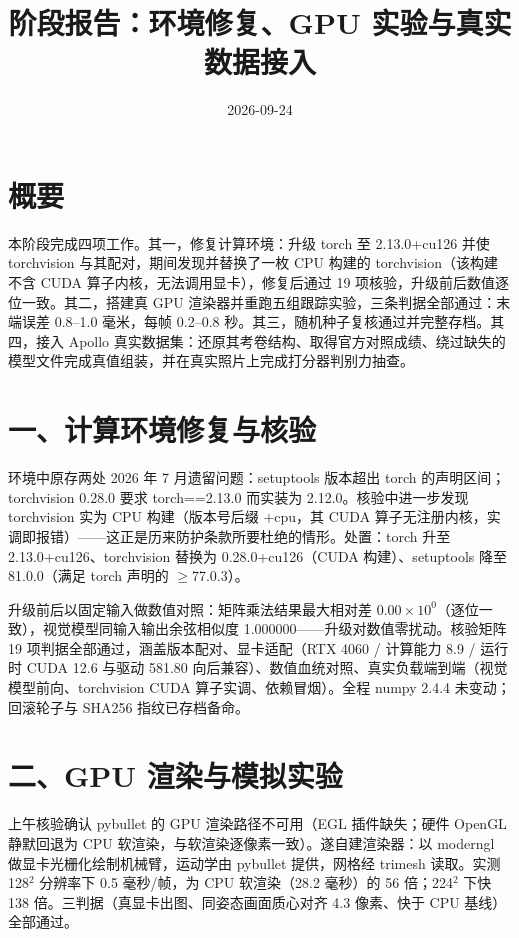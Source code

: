 \documentclass{article}
\title{阶段报告：环境修复、GPU 实验与真实数据接入}
\author{}
\date{2026-09-24}
\begin{document}
\maketitle

\section{概要}
本阶段完成四项工作。其一，修复计算环境：升级 torch 至 2.13.0+cu126 并使 torchvision 与其配对，期间发现并替换了一枚 CPU 构建的 torchvision（该构建不含 CUDA 算子内核，无法调用显卡），修复后通过 19 项核验，升级前后数值逐位一致。其二，搭建真 GPU 渲染器并重跑五组跟踪实验，三条判据全部通过：末端误差 0.8--1.0 毫米，每帧 0.2--0.8 秒。其三，随机种子复核通过并完整存档。其四，接入 Apollo 真实数据集：还原其考卷结构、取得官方对照成绩、绕过缺失的模型文件完成真值组装，并在真实照片上完成打分器判别力抽查。

\section{一、计算环境修复与核验}
环境中原存两处 2026 年 7 月遗留问题：setuptools 版本超出 torch 的声明区间；torchvision 0.28.0 要求 torch==2.13.0 而实装为 2.12.0。核验中进一步发现 torchvision 实为 CPU 构建（版本号后缀 +cpu，其 CUDA 算子无注册内核，实调即报错）——这正是历来防护条款所要杜绝的情形。处置：torch 升至 2.13.0+cu126、torchvision 替换为 0.28.0+cu126（CUDA 构建）、setuptools 降至 81.0.0（满足 torch 声明的 $\geq$77.0.3）。

升级前后以固定输入做数值对照：矩阵乘法结果最大相对差 $0.00\times10^{0}$（逐位一致），视觉模型同输入输出余弦相似度 1.000000——升级对数值零扰动。核验矩阵 19 项判据全部通过，涵盖版本配对、显卡适配（RTX 4060 / 计算能力 8.9 / 运行时 CUDA 12.6 与驱动 581.80 向后兼容）、数值血统对照、真实负载端到端（视觉模型前向、torchvision CUDA 算子实调、依赖冒烟）。全程 numpy 2.4.4 未变动；回滚轮子与 SHA256 指纹已存档备命。

\section{二、GPU 渲染与模拟实验}
上午核验确认 pybullet 的 GPU 渲染路径不可用（EGL 插件缺失；硬件 OpenGL 静默回退为 CPU 软渲染，与软渲染逐像素一致）。遂自建渲染器：以 moderngl 做显卡光栅化绘制机械臂，运动学由 pybullet 提供，网格经 trimesh 读取。实测 128$^2$ 分辨率下 0.5 毫秒/帧，为 CPU 软渲染（28.2 毫秒）的 56 倍；224$^2$ 下快 138 倍。三判据（真显卡出图、同姿态画面质心对齐 4.3 像素、快于 CPU 基线）全部通过。
\end{document}
